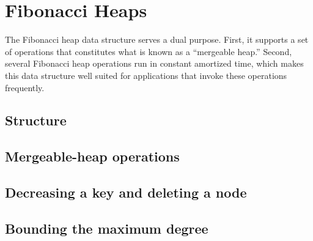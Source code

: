 \chapter{Fibonacci Heaps}
\label{chap:fibheaps}

The Fibonacci heap data structure serves a dual purpose. First, it supports a set of
operations that constitutes what is known as a ``mergeable heap.'' Second, several
Fibonacci heap operations run in constant amortized time, which makes this data
structure well suited for applications that invoke these operations frequently.

\section{Structure}


\section{Mergeable-heap operations}

\section{Decreasing a key and deleting a node}


\section{Bounding the maximum degree}